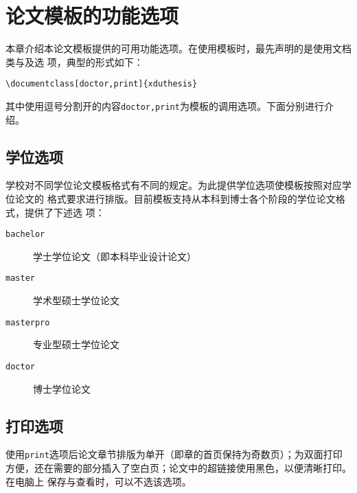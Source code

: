 

\chapter{\texorpdfstring{\XeLaTeX{}}{XeLaTeX}%
          论文模板的功能选项}
\label{cha:options}

本章介绍本论文模板提供的可用功能选项。在使用模板时，最先声明的是使用文档类与及选
项，典型的形式如下：
\begin{lstlisting}[emph={doctor,print}, emphstyle=\textbf]
  \documentclass[doctor,print]{xduthesis}
\end{lstlisting}
其中使用逗号分割开的内容\texttt{doctor,print}为模板的调用选项。下面分别进行介绍。

\section{学位选项}
\label{sec:degree}

学校对不同学位论文模板格式有不同的规定。为此提供学位选项使模板按照对应学位论文的
格式要求进行排版。目前模板支持从本科到博士各个阶段的学位论文格式，提供了下述选
项：

\begin{description}
\item [\texttt{bachelor}] 学士学位论文（即本科毕业设计论文）
\item [\texttt{master}] 学术型硕士学位论文
\item [\texttt{masterpro}] 专业型硕士学位论文
\item [\texttt{doctor}] 博士学位论文
\end{description}

\section{打印选项}
\label{sec:print}

使用\texttt{print}选项后论文章节排版为单开（即章的首页保持为奇数页）；为双面打印
方便，还在需要的部分插入了空白页；论文中的超链接使用黑色，以便清晰打印。在电脑上
保存与查看时，可以不选该选项。

